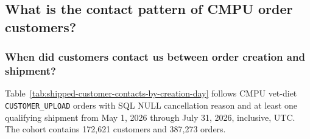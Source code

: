 \clearpage
\subsection{What is the contact pattern of CMPU order customers?}
\label{subsec:shipped-customer-contact-analysis}
\subsubsection{When did customers contact us between order creation and shipment?}
Table~\ref{tab:shipped-customer-contacts-by-creation-day} follows CMPU vet-diet
\texttt{CUSTOMER\_UPLOAD} orders with SQL NULL cancellation reason and at least
one qualifying shipment from May 1, 2026 through July 31, 2026, inclusive, UTC.
The cohort contains 172,621 customers and 387,273 orders.

